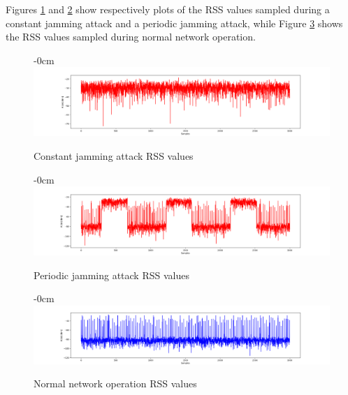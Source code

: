 \documentclass[futureinternet,article,submit,pdftex,moreauthors]{Definitions/mdpi}
\begin{document}
Figures \ref{fig:ConstantJammingSignal} and \ref{fig:PeriodicJammingSignal} show respectively plots of the RSS values sampled during a constant jamming attack and a periodic jamming attack, while Figure \ref{fig:normalSignal} shows the RSS values sampled during normal network operation.

\begin{figure}[H]
	\begin{adjustwidth}{-\extralength}{0cm}
	\centering
	\includegraphics[width=21cm]{img/ConstantJammingSignal.png}
	\end{adjustwidth}
	\caption{Constant jamming attack RSS values}\label{fig:ConstantJammingSignal}
\end{figure}  
\unskip
\begin{figure}[H]
	\begin{adjustwidth}{-\extralength}{0cm}
	\centering
	\includegraphics[width=21cm]{img/PeriodicJammingSignal.png}
	\end{adjustwidth}
	\caption{Periodic jamming attack RSS values}\label{fig:PeriodicJammingSignal}
\end{figure}  
\unskip

\begin{figure} [H]
	\begin{adjustwidth}{-\extralength}{0cm}
	\centering
	\includegraphics[width=21cm]{img/NormalSignal.png}
	\end{adjustwidth}
	\caption{Normal network operation RSS values}\label{fig:normalSignal}
\end{figure}
\unskip
\end{document}
